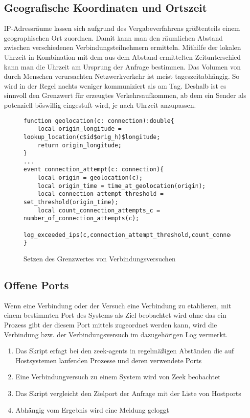 \subsection{Geografische Koordinaten und Ortszeit}
IP-Adressräume lassen sich aufgrund des Vergabeverfahrens größtenteils einem geographischen Ort zuordnen. Damit kann man den räumlichen Abstand zwischen verschiedenen Verbindungsteilnehmern ermitteln. Mithilfe der lokalen Uhrzeit in Kombination mit dem aus dem Abstand ermittelten Zeitunterschied kann man die Uhrzeit am Ursprung der Anfrage bestimmen. Das Volumen von durch Menschen verursachten Netzwerkverkehr ist meist tageszeitabhängig. So wird in der Regel nachts weniger kommuniziert als am Tag.  Deshalb ist es sinnvoll den Grenzwert für erzeugtes Verkehrsaufkommen, ab dem ein Sender als potenziell böswillig eingestuft wird, je nach Uhrzeit anzupassen.
\begin{figure}[H]
\begin{lstlisting}
function geolocation(c: connection):double{
	local origin_longitude = lookup_location(c$id$orig_h)$longitude;
	return origin_longitude;
}
...
event connection_attempt(c: connection){
	local origin = geolocation(c);
	local origin_time = time_at_geolocation(origin);
	local connection_attempt_threshold = set_threshold(origin_time);
	local count_connection_attempts_c = number_of_connection_attempts(c);
	log_exceeded_ips(c,connection_attempt_threshold,count_connection_attempts_c);
}
\end{lstlisting}
\caption{Setzen des Grenzwertes von Verbindungsversuchen}
\end{figure}
\subsection{Offene Ports}
Wenn eine Verbindung oder der Versuch eine Verbindung zu etablieren, mit einem bestimmten Port des Systems als Ziel beobachtet wird ohne das ein Prozess gibt der diesem Port mittels zugeordnet werden kann, wird die Verbindung bzw. der Verbindungsversuch im dazugehörigen Log vermerkt.
\begin{enumerate}
\item{Das Skript erfagt bei den zeek-agents in regelmäßigen Abständen die auf Hostsystemen laufenden Prozesse und deren verwendete Ports}
\item{Eine Verbindungversuch zu einem System wird von Zeek beobachtet}
\item{Das Skript vergleicht den Zielport der Anfrage mit der Liste von Hostports}
\item{Abhängig vom Ergebnis wird eine Meldung geloggt}
\end{enumerate}



